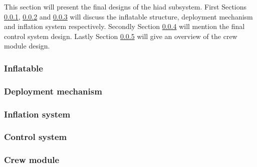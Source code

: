 %
This section will present the final designs of the \gls{hiad} subsystem. First Sections \ref{subsec:infldes}, \ref{subsec:depldes} and \ref{subsec:inflsys} will discuss the inflatable structure, deployment mechanism and inflation system respectively. Secondly Section \ref{subsec:controlsys} will mention the final control system design. Lastly Section \ref{subsec:crewmod} will give an overview of the crew module design.
\subsubsection{Inflatable}\label{subsec:infldes}


%

\subsubsection{Deployment mechanism}\label{subsec:depldes}


\subsubsection{Inflation system}\label{subsec:inflsys}


\subsubsection{Control system}\label{subsec:controlsys}


\subsubsection{Crew module}\label{subsec:crewmod}


